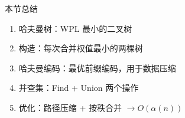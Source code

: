 \documentclass[10pt, aspectratio=169]{beamer}
\begin{document}
\begin{frame}{本节总结}
    \begin{enumerate}
        \item 哈夫曼树：WPL 最小的二叉树
        \item 构造：每次合并权值最小的两棵树
        \item 哈夫曼编码：最优前缀编码，用于数据压缩
        \item 并查集：Find + Union 两个操作
        \item 优化：路径压缩 + 按秩合并 $\to O(\alpha(n))$
    \end{enumerate}
\end{frame}
\end{document}
